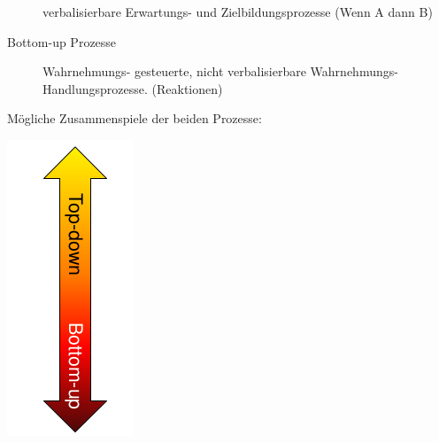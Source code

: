 \begin{description}
 verbalisierbare Erwartungs- und Zielbildungsprozesse (Wenn A dann B)
  \item[Bottom-up Prozesse] Wahrnehmungs- gesteuerte, nicht verbalisierbare Wahrnehmungs- Handlungsprozesse. (Reaktionen)
\end{description}
Mögliche Zusammenspiele der beiden Prozesse:\\
\begin{minipage}{0.1\textwidth}
  \includegraphics[width=\textwidth]{pictures/taktik_top-down_bottom-up.png}
\end{minipage}
